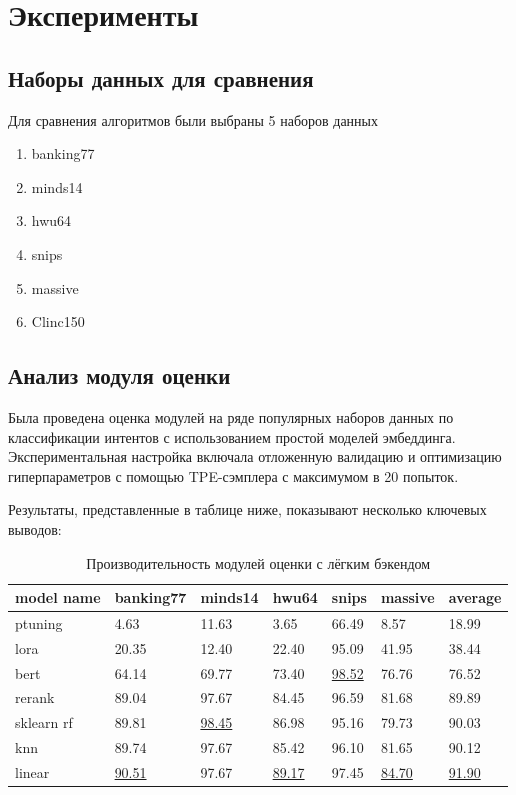 \documentclass[14pt,a4paper,oneside,openany]{extbook}
\begin{document}
\chapter{Эксперименты}
\label{sec:orgddbf4b3}
\section{Наборы данных для сравнения}
\label{sec:orgeccb4a9}
Для сравнения алгоритмов были выбраны 5 наборов данных

\begin{enumerate}
\item banking77\autocite{casanueva_efficient_2020}
\item minds14\autocite{gerz_multilingual_2021}
\item hwu64\autocite{liu_benchmarking_2019}
\item snips\autocite{coucke_snips_2018}
\item massive\autocite{fitzgerald_massive_2022}
\item Clinc150\autocite{unknown_clinc150_2020}
\end{enumerate}
\section{Анализ модуля оценки}
\label{sec:orgcd509fb}
Была проведена оценка модулей на ряде популярных наборов данных по классификации интентов с использованием простой моделей эмбеддинга. Экспериментальная настройка включала отложенную валидацию и оптимизацию гиперпараметров с помощью TPE-сэмплера с максимумом в 20 попыток.

Результаты, представленные в таблице ниже, показывают несколько ключевых выводов:

\begin{table}[h!]
\caption{\label{tbl:light_modules}Производительность модулей оценки с лёгким бэкендом}
\centering
\begin{tabular}{|p{2cm}|p{2cm}|p{2cm}|p{2cm}|p{2cm}|p{2cm}|p{2cm}|}
\hline
model name & banking77 & minds14 & hwu64 & snips & massive & average\\
\hline
ptuning & 4.63 & 11.63 & 3.65 & 66.49 & 8.57 & 18.99\\
\hline
lora & 20.35 & 12.40 & 22.40 & 95.09 & 41.95 & 38.44\\
\hline
bert & 64.14 & 69.77 & 73.40 & \uline{98.52} & 76.76 & 76.52\\
\hline
rerank & 89.04 & 97.67 & 84.45 & 96.59 & 81.68 & 89.89\\
\hline
sklearn rf & 89.81 & \uline{98.45} & 86.98 & 95.16 & 79.73 & 90.03\\
\hline
knn & 89.74 & 97.67 & 85.42 & 96.10 & 81.65 & 90.12\\
\hline
linear & \uline{90.51} & 97.67 & \uline{89.17} & 97.45 & \uline{84.70} & \uline{91.90}\\
\hline
\end{tabular}
\end{table}
\end{document}
